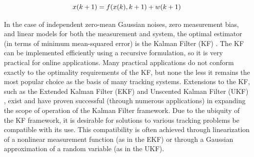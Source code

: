 \documentclass[journal]{IEEEtran}
\begin{document}
\begin{equation}
    x(k+1) = f(x(k), k+1) + w(k+1) \\
\label{eq:generalsystemmodel}
\end{equation}

In the case of independent zero-mean Gaussian noises, zero measurement bias, and linear models for both the measurement and system, the optimal estimator (in terms of minimum mean-squared error) is the Kalman Filter (KF) \cite{bar2004estimation}. The KF can be implemented efficiently using a recursive formulation, so it is very practical for online applications. Many practical applications do not conform exactly to the optimality requirements of the KF, but none the less it remains the most popular choice as the basis of many tracking systems. Extensions to the KF, such as the Extended Kalman Filter (EKF) \cite{bar2004estimation} and Unscented Kalman Filter (UKF) \cite{julier1997new}, exist and have proven successful (through numerous applications) in expanding the scope of operation of the Kalman Filter framework. Due to the ubiquity of the KF framework, it is desirable for solutions to various tracking problems be compatible with its use. This compatibility is often achieved through linearization of a nonlinear measurement function (as in the EKF) or through a Gaussian approximation of a random variable (as in the UKF).
\end{document}
